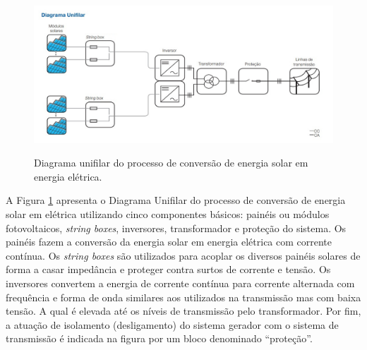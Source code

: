 \begin{figure}[H]
  \centering
  \caption{Diagrama unifilar do processo de conversão de energia solar em energia elétrica.}
  \includegraphics[width=\textwidth]{images/Diagrama-Unifilar.jpg}
  \label{fig:diagrama_unifilar}
\end{figure}

A Figura \ref{fig:diagrama_unifilar} apresenta o Diagrama Unifilar do processo de conversão de energia solar em elétrica utilizando cinco componentes básicos: painéis ou módulos fotovoltaicos, \textit{string boxes}, inversores, transformador e proteção do sistema. Os painéis fazem a conversão da energia solar em energia elétrica com corrente contínua. Os \textit{string boxes} são utilizados para acoplar os diversos painéis solares de forma a casar impedância e proteger contra surtos de corrente e tensão. Os inversores convertem a energia de corrente contínua para corrente alternada com frequência e forma de onda similares aos utilizados na transmissão mas com baixa tensão. A qual é elevada até os níveis de transmissão pelo transformador. Por fim, a atuação de isolamento (desligamento) do sistema gerador com o sistema de transmissão é indicada na figura por um bloco denominado ``proteção''.